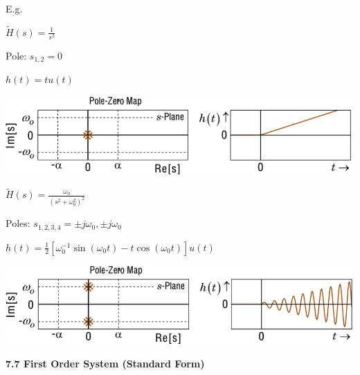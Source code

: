 \documentclass[landscape,a4paper]{extarticle}
\newenvironment{Figure}
  {\par\medskip\noindent\minipage{\linewidth}}
  {\endminipage\par\medskip}
\begin{document}
\begin{multicols*}{5}
    E.g.

    $\tilde{H}(s) = \frac{1}{s^2}$

    Pole: $s_{1,2} = 0$

    $h(t) = tu(t)$

    \begin{Figure}
        \centering
        \includegraphics[width=\linewidth]{unstableCase2_1.png}        
    \end{Figure}

    $\tilde{H}(s) = \frac{\omega_0}{(s^2 + \omega_0^2)^2}$

    Poles: $s_{1,2,3,4} = \pm j\omega_0, \pm j \omega_0$

    $h(t) = \frac{1}{2} \left[\omega_0^{-1}\sin(\omega_0 t) - t \cos(\omega_0 t)\right] u(t)$

    \begin{Figure}
        \centering
        \includegraphics[width=\linewidth]{unstableCase2_2.png}        
    \end{Figure}

    \textbf{7.7 First Order System (Standard Form)}


\end{multicols*}
\end{document}
